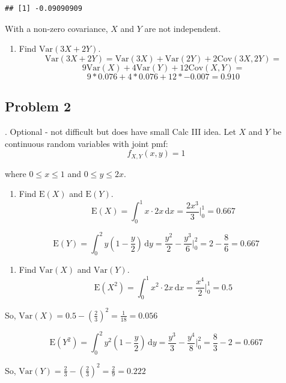 \documentclass[
]{book}
\providecommand{\tightlist}{%
  \setlength{\itemsep}{0pt}\setlength{\parskip}{0pt}}
\begin{document}
\begin{verbatim}
## [1] -0.09090909
\end{verbatim}

With a non-zero covariance, \(X\) and \(Y\) are not independent.

\begin{enumerate}
\def\labelenumi{\alph{enumi}.}
\setcounter{enumi}{3}
\tightlist
\item
  Find \(\mbox{Var}(3X+2Y)\).
  \[
  \mbox{Var}(3X+2Y)=\mbox{Var}(3X)+\mbox{Var}(2Y)+2\mbox{Cov}(3X,2Y)=
  \]
  \[
  9\mbox{Var}(X)+4\mbox{Var}(Y)+12\mbox{Cov}(X,Y) =
  \]
  \[
  9*0.076+4*0.076+12*-0.007 = 0.910
  \]
\end{enumerate}

\hypertarget{problem-2-14}{%
\subsection{Problem 2}\label{problem-2-14}}

. Optional - not difficult but does have small Calc III idea. Let \(X\) and \(Y\) be continuous random variables with joint pmf:
\[
f_{X,Y}(x,y)=1
\]

where \(0 \leq x \leq 1\) and \(0 \leq y \leq 2x\).

\begin{enumerate}
\def\labelenumi{\alph{enumi}.}
\tightlist
\item
  Find \(\mbox{E}(X)\) and \(\mbox{E}(Y)\).
  \[
  \mbox{E}(X)=\int_0^1 x\cdot 2x\,\mathrm{d}x = \frac{2x^3}{3}\bigg|_0^1=0.667
  \]
\end{enumerate}

\[
\mbox{E}(Y)=\int_0^2 y\left(1-\frac{y}{2}\right)\,\mathrm{d}y = \frac{y^2}{2}-\frac{y^3}{6}\bigg|_0^2=2-\frac{8}{ 6}=0.667
\]

\begin{enumerate}
\def\labelenumi{\alph{enumi}.}
\setcounter{enumi}{1}
\tightlist
\item
  Find \(\mbox{Var}(X)\) and \(\mbox{Var}(Y)\).
  \[
  \mbox{E}(X^2)=\int_0^1 x^2\cdot 2x\,\mathrm{d}x = \frac{x^4}{2}\bigg|_0^1=0.5
  \]
\end{enumerate}

So, \(\mbox{Var}(X)=0.5-\left(\frac{2}{3}\right)^2=\frac{1}{ 18}=0.056\)

\[
\mbox{E}(Y^2)=\int_0^2 y^2\left(1-\frac{y}{2}\right)\,\mathrm{d}y = \frac{y^3}{3}-\frac{y^4}{8}\bigg|_0^2=\frac{8}{ 3}-2=0.667
\]

So, \(\mbox{Var}(Y)=\frac{2}{ 3}-\left(\frac{2}{3}\right)^2=\frac{2}{9}=0.222\)
\end{document}
